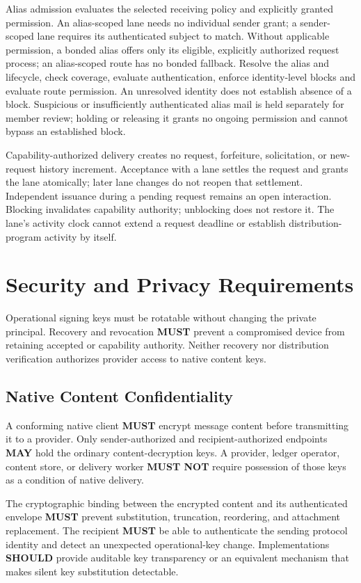 \documentclass[11pt]{article}
\newcommand{\MUST}{\textbf{MUST}}
\newcommand{\MUSTNOT}{\textbf{MUST NOT}}
\newcommand{\SHOULD}{\textbf{SHOULD}}
\newcommand{\MAY}{\textbf{MAY}}
\begin{document}
Alias admission evaluates the selected receiving policy and explicitly granted
permission. An alias-scoped lane needs no individual sender grant; a sender-scoped
lane requires its authenticated subject to match. Without applicable permission,
a bonded alias offers only its eligible, explicitly authorized request process;
an alias-scoped route has no bonded fallback. Resolve the alias
and lifecycle, check coverage, evaluate authentication, enforce identity-level
blocks and evaluate route permission. An unresolved identity does not establish
absence of a block. Suspicious or insufficiently authenticated alias mail
is held separately for member review; holding or releasing it grants no ongoing
permission and cannot bypass an established block.

Capability-authorized delivery creates no request, forfeiture, solicitation, or
new-request history increment. Acceptance with a lane settles the request and
grants the lane atomically; later lane changes do not reopen that settlement.
Independent issuance during a pending request remains an open interaction.
Blocking invalidates capability authority; unblocking
does not restore it. The lane's activity clock cannot extend a request deadline
or establish distribution-program activity by itself.

\section{Security and Privacy Requirements}

Operational signing keys must be rotatable without changing the private
principal. Recovery and revocation \MUST{} prevent a compromised device from
retaining accepted or capability authority. Neither recovery nor distribution
verification authorizes provider access to native content keys.

\subsection{Native Content Confidentiality}

A conforming native client \MUST{} encrypt message content before transmitting it
to a provider. Only sender-authorized and recipient-authorized endpoints \MAY{} hold
the ordinary content-decryption keys. A provider, ledger operator, content store,
or delivery worker \MUSTNOT{} require possession of those keys as a condition of
native delivery.

The cryptographic binding between the encrypted content and its authenticated
envelope \MUST{} prevent substitution, truncation, reordering, and attachment
replacement. The recipient \MUST{} be able to authenticate the sending protocol
identity and detect an unexpected operational-key change. Implementations
\SHOULD{} provide auditable key transparency or an equivalent mechanism that
makes silent key substitution detectable.
\end{document}
